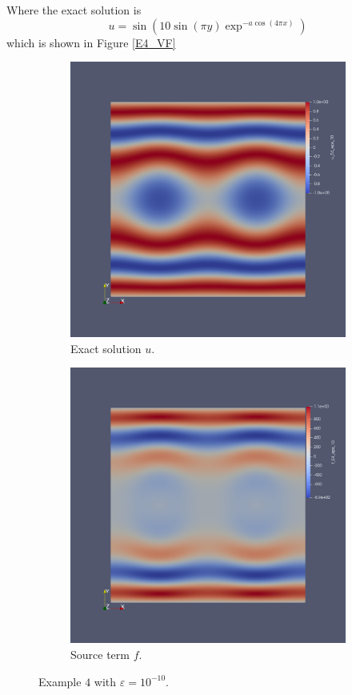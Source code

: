 \documentclass[12pt,a4paper]{article}
\begin{document}
Where the exact solution is 
\begin{equation}
u = \sin(10 \sin(\pi y) \exp^{-a\cos(4 \pi x)}) 
\end{equation}
which is shown in Figure \ref{E4_VF}

\begin{figure}[H]
 \begin{subfigure}{0.5\textwidth}
     \includegraphics[width=\textwidth]{Pics/uf/U_E4_eps_10.png}
     \caption{Exact solution $u$.}
 \end{subfigure}
   \begin{subfigure}{0.5\textwidth}
     \includegraphics[width=\textwidth]{Pics/uf/F_E4_eps_10.png}
     \caption{Source term $f$.}
 \end{subfigure}
 \caption{Example $4$ with $\varepsilon = 10^{-10}$.} \label{E4_uf}
\end{figure}
\end{document}
